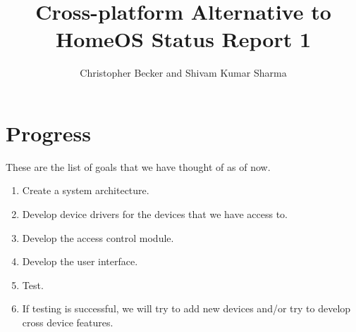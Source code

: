 \documentclass[letterpaper,12pt]{article}
\title{Cross-platform Alternative to HomeOS Status Report 1}
\author{Christopher Becker and Shivam Kumar Sharma}
\begin{document}
\maketitle

\section{Progress}
These are the list of goals that we have thought of as of now.
\begin{enumerate}
 \item Create a system architecture.
 \item Develop device drivers for the devices that we have access to.
 \item Develop the access control module.
 \item Develop the user interface.
 \item Test.
 \item If testing is successful, we will try to add new devices and/or try to develop cross device features.
\end{enumerate}



\end{document}
